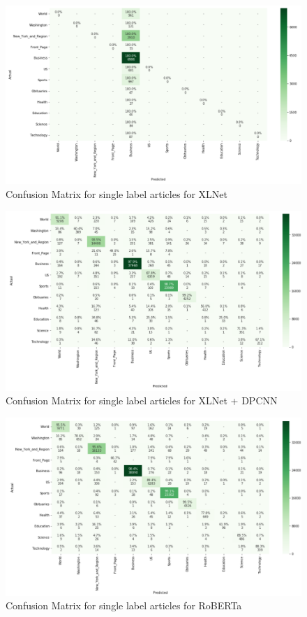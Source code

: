 \documentclass{article}
\begin{document}
\begin{figure}[!htb]
    \centering
    \includegraphics[scale=0.4]{images/confusion_xlnet.png}
    \caption{Confusion Matrix for single label articles for XLNet}
    \label{fig:confusion_xlnet}
\end{figure}

\begin{figure}[!htb]
    \centering
    \includegraphics[scale=0.4]{images/confusion_xlnet_dpcnn.png}
    \caption{Confusion Matrix for single label articles for XLNet + DPCNN}
    \label{fig:confusion_bert_xlnet}
\end{figure}

\begin{figure}[!htb]
    \centering
    \includegraphics[scale=0.4]{images/confusion_roberta.png}
    \caption{Confusion Matrix for single label articles for RoBERTa}
    \label{fig:confusion_roberta}
\end{figure}
\end{document}
